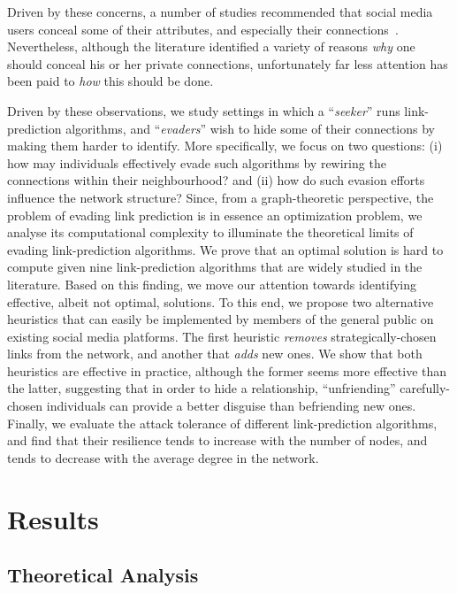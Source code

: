 \documentclass[twocolumn]{article}
\begin{document}
Driven by these concerns, a number of studies recommended that social media users conceal some of their attributes, and especially their connections~\cite{lindamood2009inferring,heatherly2013preventing}. Nevertheless, although the literature identified a variety of reasons \emph{why} one should conceal his or her private connections, unfortunately far less attention has been paid to \emph{how} this should be done.

Driven by these observations, we study settings in which a ``\emph{seeker}'' runs link-prediction algorithms, and ``\emph{evaders}'' wish to hide some of their connections by making them harder to identify. More specifically, we focus on two questions: (i) how may individuals effectively evade such algorithms by rewiring the connections within their neighbourhood? and (ii) how do such evasion efforts influence the network structure?
Since, from a graph-theoretic perspective, the problem of evading link prediction is in essence an optimization problem, we analyse its computational complexity to illuminate the theoretical limits of evading link-prediction algorithms. We prove that an optimal solution is hard to compute given nine link-prediction algorithms that are widely studied in the literature. Based on this finding, we move our attention towards identifying effective, albeit not optimal, solutions. To this end, we propose two alternative heuristics that can easily be implemented by members of the general public on existing social media platforms. The first heuristic \textit{removes} strategically-chosen links from the network, and another that \textit{adds} new ones. We show that both heuristics are effective in practice, although the former seems more effective than the latter, suggesting that in order to hide a relationship, ``unfriending'' carefully-chosen individuals can provide a better disguise than befriending new ones. Finally, we evaluate the attack tolerance of different link-prediction algorithms, and find that their resilience tends to increase with the number of nodes, and tends to decrease with the average degree in the network.

\section*{Results}

\subsection*{Theoretical Analysis}\label{sec:theoreticalAnalysis}
\end{document}
